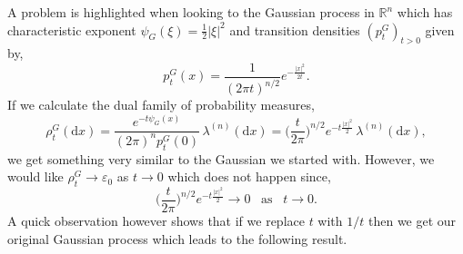 \documentclass[a4paper, 12pt]{report}
\theoremstyle{cor}
\theoremstyle{remark}
\theoremstyle{definition}
\begin{document}
A problem is highlighted when looking to the Gaussian process in $\mathbb{R}^n$ which has characteristic exponent $\psi_G(\xi) = \frac{1}{2}|\xi|^2$ and transition densities $(p_t^G)_{t > 0}$ given by,
$$
p_t^G(x) = \frac{1}{(2\pi t)^{n/2}}e^{-\frac{|x|^2}{2t}}.
$$
If we calculate the dual family of probability measures,
$$
\rho_t^G(\mathrm{d}x) = \frac{e^{-t\psi_G(x)}}{(2\pi)^np_t^G(0)}\,\lambda^{(n)}(\mathrm{d}x) = \bigg(\frac{t}{2\pi}\bigg)^{n/2}e^{-t\frac{|x|^2}{2}}\,\lambda^{(n)}(\mathrm{d}x),
$$
we get something very similar to the Gaussian we started with.  However, we would like $\rho_t^G \to \varepsilon_0$ as $t \to 0$ which does not happen since,
$$
\bigg(\frac{t}{2\pi}\bigg)^{n/2}e^{-t\frac{|x|^2}{2}} \to 0 \,\,\,\,\, \text{as} \,\,\,\,\, t \to 0.
$$
A quick observation however shows that if we replace $t$ with $1/t$ then we get our original Gaussian process which leads to the following result.
\end{document}
